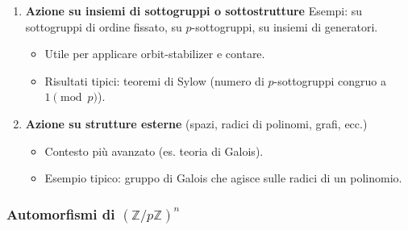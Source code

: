\documentclass[12pt]{scrartcl}
\theoremstyle{style}
\numberwithin{equation}{subsection}
\begin{document}
\begin{enumerate}
  \item \textbf{Azione su insiemi di sottogruppi o sottostrutture}  
  Esempi: su sottogruppi di ordine fissato, su \(p\)-sottogruppi, su insiemi di generatori.  
  \begin{itemize}
    \item Utile per applicare orbit-stabilizer e contare.  
    \item Risultati tipici: teoremi di Sylow (numero di \(p\)-sottogruppi congruo a \(1 \pmod p\)).
  \end{itemize}

  \item \textbf{Azione su strutture esterne} (spazi, radici di polinomi, grafi, ecc.)  
  \begin{itemize}
    \item Contesto più avanzato (es. teoria di Galois).  
    \item Esempio tipico: gruppo di Galois che agisce sulle radici di un polinomio.
  \end{itemize}
\end{enumerate}

\subsubsection{Automorfismi di $(\mathbb{Z}/p\mathbb{Z})^n$}
\end{document}
